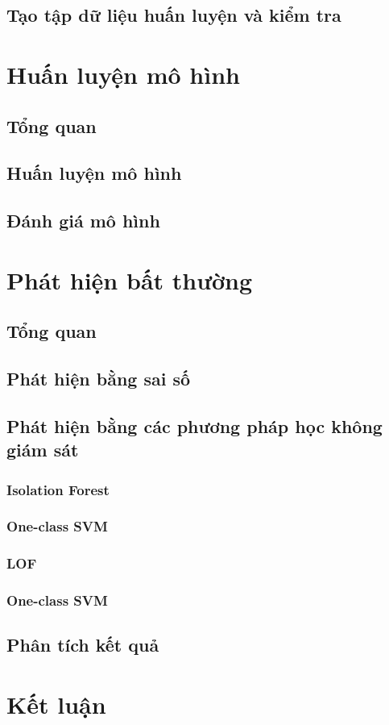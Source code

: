 \subsection{Tạo tập dữ liệu huấn luyện và kiểm tra}

\section{Huấn luyện mô hình}
\subsection{Tổng quan}
\subsection{Huấn luyện mô hình}
\subsection{Đánh giá mô hình}

\section{Phát hiện bất thường}
\subsection{Tổng quan}
\subsection{Phát hiện bằng sai số}
\subsection{Phát hiện bằng các phương pháp học không giám sát}
\subsubsection{Isolation Forest}
\subsubsection{One-class SVM}
\subsubsection{LOF}
\subsubsection{One-class SVM}
\subsection{Phân tích kết quả}


\section{Kết luận}

